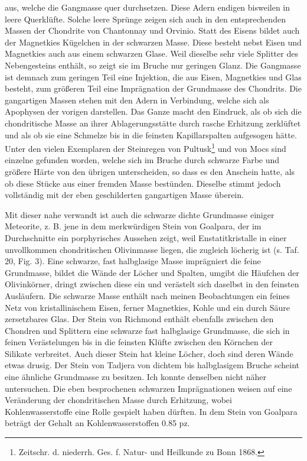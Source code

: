 \documentclass[a4paper, 11pt, oneside, polutonikogreek, german]{article}
\begin{document}
aus, welche die Gangmasse quer durchsetzen. Diese Adern endigen bisweilen in leere Querklüfte. Solche leere Sprünge zeigen sich auch in den entsprechenden Massen der Chondrite von Chantonnay und Orvinio. Statt des Eisens bildet auch der Magnetkies Kügelchen in der schwarzen Masse. Diese besteht nebst Eisen und Magnetkies auch aus einem schwarzen Glase. Weil dieselbe sehr viele Splitter des Nebengesteins enthält, so zeigt sie im Bruche nur geringen Glanz. Die Gangmasse ist demnach zum geringen Teil eine Injektion, die aus Eisen, Magnetkies und Glas besteht, zum größeren Teil eine Imprägnation der Grundmasse des Chondrits. Die gangartigen Massen stehen mit den Adern in Verbindung, welche sich als Apophysen der vorigen darstellen. Das Ganze macht den Eindruck, als ob sich die chondritische Masse an ihrer Ablagerungsstätte durch rasche Erhitzung zerklüftet und als ob sie eine Schmelze bis in die feinsten Kapillarspalten aufgesogen hätte. Unter den vielen Exemplaren der Steinregen von Pultusk\footnote{Zeitschr. d. niederrh. Ges. f. Natur- und Heilkunde zu Bonn 1868.} und von Mocs sind einzelne gefunden worden, welche sich im Bruche durch schwarze Farbe und größere Härte von den übrigen unterscheiden, so dass es den Anschein hatte, als ob diese Stücke aus einer fremden Masse bestünden. Dieselbe stimmt jedoch vollständig mit der eben geschilderten gangartigen Masse überein.

Mit dieser nahe verwandt ist auch die schwarze dichte Grundmasse einiger Meteorite, z. B. jene in dem merkwürdigen Stein von Goalpara, der im Durchschnitte ein porphyrisches Aussehen zeigt, weil Enstatitkristalle in einer unvollkommen chondritischen Olivinmasse liegen, die zugleich löcherig ist (s. Taf. 20, Fig. 3). Eine schwarze, fast halbglasige Masse imprägniert die feine Grundmasse, bildet die Wände der Löcher und Spalten, umgibt die Häufchen der Olivinkörner, dringt zwischen diese ein und verästelt sich daselbst in den feinsten Ausläufern. Die schwarze Masse enthält nach meinen Beobachtungen ein feines Netz von kristallinischem Eisen, ferner Magnetkies, Kohle und ein durch Säure zersetzbares Glas. Der Stein von Richmond enthält ebenfalls zwischen den Chondren und Splittern eine schwarze fast halbglasige Grundmasse, die sich in feinen Verästelungen bis in die feinsten Klüfte zwischen den Körnchen der Silikate verbreitet. Auch dieser Stein hat kleine Löcher, doch sind deren Wände etwas drusig. Der Stein von Tadjera von dichtem bis halbglasigem Bruche scheint eine ähnliche Grundmasse zu besitzen. Ich konnte denselben nicht näher untersuchen. Die eben besprochenen schwarzen Imprägnationen weisen auf eine Veränderung der chondritischen Masse durch Erhitzung, wobei Kohlenwasserstoffe eine Rolle gespielt haben dürften. In dem Stein von Goalpara beträgt der Gehalt an Kohlenwasserstoffen 0.85 pz.
\end{document}
